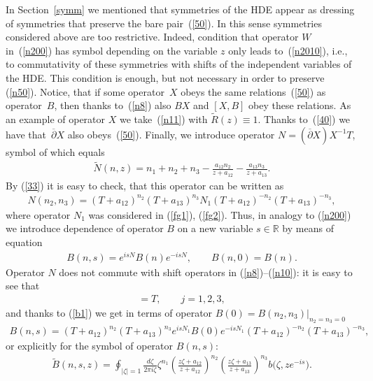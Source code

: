 \documentclass[pdftex]{sigma}
\numberwithin{equation}{section}
\begin{document}
In Section~\ref{symm} we mentioned that symmetries of the HDE appear as dressing of symmetries that preserve the bare pair~(\ref{50}). In this sense symmetries considered above are too restrictive. Indeed, condition that operator $W$ in~(\ref{n200}) has symbol depending on the variable $z$ only leads to~(\ref{n2010}), i.e., to commutativity of these symmetries with shifts of the independent variables of the HDE. This condition is enough, but not necessary in order to preserve (\ref{n50}). Notice, that if some operator~$X$ obeys the same relations~(\ref{50}) as operator~$B$, then thanks to~(\ref{n8}) also $BX$ and $[X,B]$ obey these relations. As an example of operator $X$ we take~(\ref{n11}) with $\widetilde{R}(z)\equiv1$. Thanks to~(\ref{40}) we have that~$\overline\partial{X}$ also obeys~(\ref{50}). Finally, we introduce operator $N=(\overline\partial{X})X^{-1}T$, symbol of which equals
\begin{gather*}
\widetilde{N}(n,z)=n_1+n_2+n_3-\frac{a_{12}n_2}{z+a_{12}}-\frac{a_{13}n_3}{z+a_{13}}.%
 \end{gather*}
By (\ref{33}) it is easy to check, that this operator can be written as
 \begin{gather*}
 N(n_2,n_3)=(T+a_{12})^{n_2}(T+a_{13})^{n_3}N_{1}(T+a_{12})^{-n_2}(T+a_{13})^{-n_3},%
 \end{gather*}
where operator $N_1$ was considered in (\ref{fg1}), (\ref{fg2}). Thus, in analogy to (\ref{n200}) we introduce dependence of operator $B$ on a new variable $s\in\mathbb{R}$ by means of equation
\begin{gather}
 B(n,s)=e^{isN}B(n)e^{-isN},\qquad B(n,0)=B(n).\label{a2}
\end{gather}
Operator $N$ does not commute with shift operators in (\ref{n8})--(\ref{n10}): it is easy to see that
\begin{gather*}
 [T,N]=T,\qquad j=1,2,3,%
\end{gather*}
and thanks to (\ref{b1}) we get in terms of operator $B(0)=B(n_2,n_3)|_{n_2=n_3=0}$
\begin{gather}
 B(n,s)=(T+a_{12})^{n_2}(T+a_{13})^{n_3}e^{isN_1}B(0)e^{-isN_1}(T+a_{12})^{-n_2}(T+a_{13})^{-n_3},\label{a:4}
\end{gather}
or explicitly for the symbol of operator $B(n,s)$:
\begin{gather}
\widetilde{B}(n,s,z)=\oint_{|\zeta|=1}\frac{d\zeta}{2\pi i\zeta}\zeta^{n_1} \left(\frac{z\zeta+a_{12}}{z+a_{12}}\right)^{n_2}\left(\frac{z\zeta+a_{13}}{z+a_{13}}\right)^{n_3}b\big(\zeta,ze^{-is}\big).\label{a4}
\end{gather}
\end{document}

